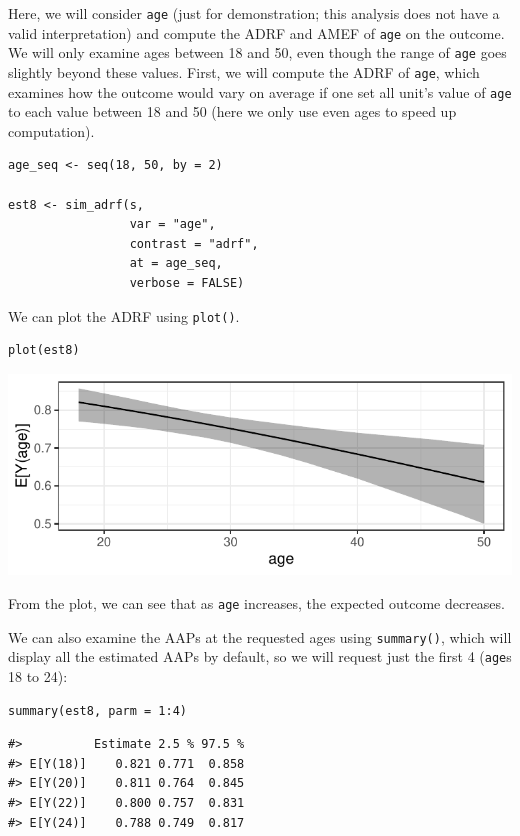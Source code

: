 Here, we will consider \texttt{age} (just for demonstration; this analysis does not have a valid interpretation) and compute the ADRF and AMEF of \texttt{age} on the outcome. We will only examine ages between 18 and 50, even though the range of \texttt{age} goes slightly beyond these values. First, we will compute the ADRF of \texttt{age}, which examines how the outcome would vary on average if one set all unit's value of \texttt{age} to each value between 18 and 50 (here we only use even ages to speed up computation).

\begin{verbatim}
age_seq <- seq(18, 50, by = 2)

est8 <- sim_adrf(s,
                 var = "age",
                 contrast = "adrf",
                 at = age_seq,
                 verbose = FALSE)
\end{verbatim}

We can plot the ADRF using \texttt{plot()}.

\begin{verbatim}
plot(est8)
\end{verbatim}

\begin{center}\includegraphics{figures/unnamed-chunk-25-1} \end{center}

From the plot, we can see that as \texttt{age} increases, the expected outcome decreases.

We can also examine the AAPs at the requested ages using \texttt{summary()}, which will display all the estimated AAPs by default, so we will request just the first 4 (\texttt{age}s 18 to 24):

\begin{verbatim}
summary(est8, parm = 1:4)
\end{verbatim}

\begin{verbatim}
#>          Estimate 2.5 % 97.5 %
#> E[Y(18)]    0.821 0.771  0.858
#> E[Y(20)]    0.811 0.764  0.845
#> E[Y(22)]    0.800 0.757  0.831
#> E[Y(24)]    0.788 0.749  0.817
\end{verbatim}

